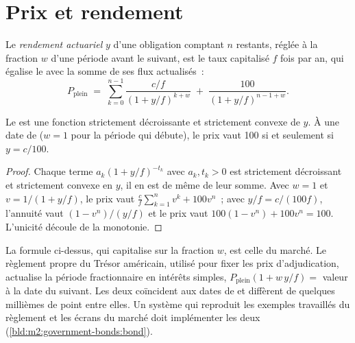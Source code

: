 \section{Prix et rendement}

\begin{definition}\label{def:m2:government-bonds:ytm}
Le \emph{rendement actuariel} $y$ d'une obligation comptant $n$
 restants, réglée à la fraction $w$ d'une période avant le suivant, est le taux
capitalisé $f$ fois par an, qui égalise le  avec
la somme de ses flux actualisés~:
\[
P_{\text{plein}} \;=\; \sum_{k=0}^{n-1} \frac{c/f}{(1 + y/f)^{k+w}} \;+\; \frac{100}{(1 + y/f)^{n-1+w}} .
\]
\end{definition}

\begin{proposition}\label{prop:m2:government-bonds:priceyield}
Le  est une fonction strictement décroissante et strictement convexe de $y$. À
une date de  ($w = 1$ pour la période qui débute), le prix vaut 100 si et
seulement si $y = c/100$.
\end{proposition}
\begin{proof}
Chaque terme $a_k (1 + y/f)^{-t_k}$ avec $a_k, t_k > 0$ est strictement décroissant
et strictement convexe en $y$, il en est de même de leur somme. Avec $w = 1$ et $v = 1/(1 +
y/f)$, le prix vaut $\frac cf \sum_{k=1}^{n} v^k + 100 v^n$~; avec $y/f =
c/(100 f)$, l'annuité vaut $(1 - v^n)/(y/f)$ et le prix vaut $100(1 - v^n)
+ 100 v^n = 100$. L'unicité découle de la monotonie.
\end{proof}

\begin{remark}\label{rem:m2:government-bonds:conventions}
La formule ci-dessus, qui capitalise sur la fraction $w$, est celle du marché.
Le règlement propre du Trésor américain, utilisé pour fixer les prix d'adjudication, actualise la
période fractionnaire en intérêts simples, $P_{\text{plein}}(1 + w\,y/f) =$ valeur à
la date du  suivant. Les deux coïncident aux dates de  et diffèrent
de quelques millièmes de point entre elles. Un système qui reproduit les
exemples travaillés du règlement et les écrans du marché doit implémenter les deux
(\cref{bld:m2:government-bonds:bond}).
\end{remark}


